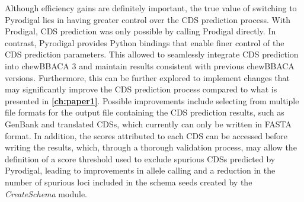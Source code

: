 Although efficiency gains are definitely important, the true value of switching to Pyrodigal lies in having greater control over the \ac{CDS} prediction process. With Prodigal, \ac{CDS} prediction was only possible by calling Prodigal directly. In contrast, Pyrodigal provides Python bindings that enable finer control of the \ac{CDS} prediction parameters. This allowed to seamlessly integrate \ac{CDS} prediction into chewBBACA 3 and maintain results consistent with previous chewBBACA versions. Furthermore, this can be further explored to implement changes that may significantly improve the \ac{CDS} prediction process compared to what is presented in \textbf{\autoref{ch:paper1}}. Possible improvements include selecting from multiple file formats for the output file containing the \ac{CDS} prediction results, such as GenBank and translated \ac{CDSs}, which currently can only be written in FASTA format. In addition, the scores attributed to each \ac{CDS} can be accessed before writing the results, which, through a thorough validation process, may allow the definition of a score threshold used to exclude spurious \ac{CDSs} predicted by Pyrodigal, leading to improvements in allele calling and a reduction in the number of spurious loci included in the schema seeds created by the \textit{CreateSchema} module.

